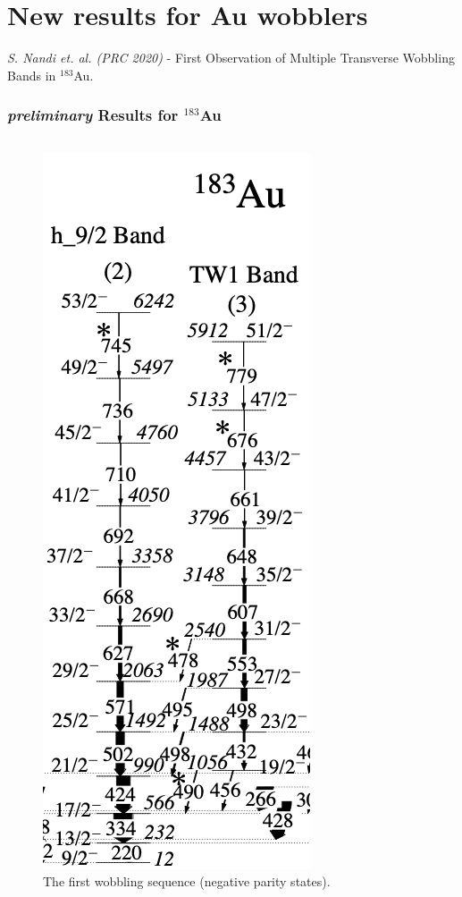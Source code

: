 \documentclass{beamer}
\begin{document}
\section{New results for Au wobblers}  
\begin{frame}
\textit{S. Nandi et. al. (PRC 2020)} - First Observation of Multiple Transverse Wobbling Bands in $^{183}$Au.
    \frametitle{{\footnotesize \emph{preliminary}} Results for $^{183}$Au}
    \begin{columns}[c] 
     \begin{figure}
         \centering
         \includegraphics[scale=0.15]{figs/negative_Au183.png}
         \caption{The first wobbling sequence (negative parity states).}

\end{figure}
\end{columns}
\end{frame}
\end{document}
